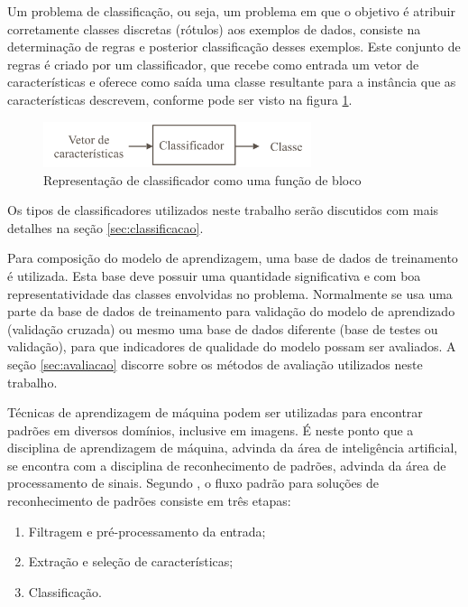 Um problema de classificação, ou seja, um problema em que o objetivo é atribuir corretamente classes discretas (rótulos) aos exemplos de dados, consiste na determinação de regras e posterior classificação desses exemplos. Este conjunto de regras é criado por um classificador, que recebe como entrada um vetor de características e oferece como saída uma classe resultante para a instância que as características descrevem, conforme pode ser visto na figura \ref{fig:classificador}.

\begin{figure}[h!]
  \centering
  \includegraphics[width=0.7\textwidth]{imgs/classificador}
  \caption{Representação de classificador como uma função de bloco}
  \label{fig:classificador}
\end{figure}

Os tipos de classificadores utilizados neste trabalho serão discutidos com mais detalhes na seção \ref{sec:classificacao}.

Para composição do modelo de aprendizagem, uma base de dados de treinamento é utilizada. Esta base deve possuir uma quantidade significativa e com boa representatividade das classes envolvidas no problema. Normalmente se usa uma parte da base de dados de treinamento para validação do modelo de aprendizado (validação cruzada) ou mesmo uma base de dados diferente (base de testes ou validação), para que indicadores de qualidade do modelo possam ser avaliados. A seção \ref{sec:avaliacao} discorre sobre os métodos de avaliação utilizados neste trabalho.

Técnicas de aprendizagem de máquina podem ser utilizadas para encontrar padrões em diversos domínios, inclusive em imagens. É neste ponto que a disciplina de aprendizagem de máquina, advinda da área de inteligência artificial, se encontra com a disciplina de reconhecimento de padrões, advinda da área de processamento de sinais. Segundo , o fluxo padrão para soluções de reconhecimento de padrões consiste em três etapas:

\begin{enumerate}
    \item Filtragem e pré-processamento da entrada;
    \item Extração e seleção de características;
    \item Classificação.
\end{enumerate}


